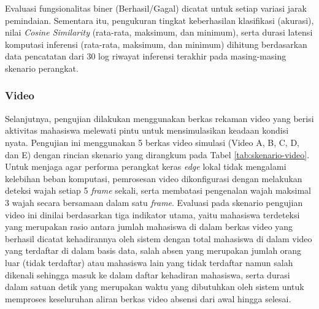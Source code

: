 Evaluasi fungsionalitas biner (Berhasil/Gagal) dicatat untuk setiap variasi jarak pemindaian. Sementara itu, pengukuran tingkat keberhasilan klasifikasi (akurasi), nilai \textit{Cosine Similarity} (rata-rata, maksimum, dan minimum), serta durasi latensi komputasi inferensi (rata-rata, maksimum, dan minimum) dihitung berdasarkan data pencatatan dari 30 log riwayat inferensi terakhir pada masing-masing skenario perangkat.

\subsubsection{Video}

Selanjutnya, pengujian dilakukan menggunakan berkas rekaman video yang berisi aktivitas mahasiswa melewati pintu untuk mensimulasikan keadaan kondisi nyata. Pengujian ini menggunakan 5 berkas video simulasi (Video A, B, C, D, dan E) dengan rincian skenario yang dirangkum pada Tabel \ref{tab:skenario-video}. Untuk menjaga agar performa perangkat keras \textit{edge} lokal tidak mengalami kelebihan beban komputasi, pemrosesan video dikonfigurasi dengan melakukan deteksi wajah setiap 5 \textit{frame} sekali, serta membatasi pengenalan wajah maksimal 3 wajah secara bersamaan dalam satu \textit{frame}. Evaluasi pada skenario pengujian video ini dinilai berdasarkan tiga indikator utama, yaitu mahasiswa terdeteksi yang merupakan rasio antara jumlah mahasiswa di dalam berkas video yang berhasil dicatat kehadirannya oleh sistem dengan total mahasiswa di dalam video yang terdaftar di dalam basis data, salah absen yang merupakan jumlah orang luar (tidak terdaftar) atau mahasiswa lain yang tidak terdaftar namun salah dikenali sehingga masuk ke dalam daftar kehadiran mahasiswa, serta durasi dalam satuan detik yang merupakan waktu yang dibutuhkan oleh sistem untuk memproses keseluruhan aliran berkas video absensi dari awal hingga selesai.

